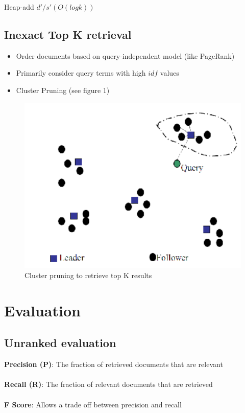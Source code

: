 \documentclass{article}%
\begin{document}
Heap-add $d′/s′ (O(log k))$
\subsection*{Inexact Top K retrieval}
\begin{itemize}
    \item Order documents based on query-independent model (like PageRank)
    \item Primarily consider query terms with high $idf$ values
    \item Cluster Pruning (see figure 1)
\end{itemize}
\begin{figure}[h]
    \caption{Cluster pruning to retrieve top K results}
    \includegraphics[scale=.5]{ClusterPruning.png}
    \centering
\end{figure}
\section*{Evaluation}
\subsection*{Unranked evaluation}
\textbf{Precision (P)}: The fraction of retrieved documents that are relevant \\
\\
\textbf{Recall (R)}: The fraction of relevant documents that are retrieved \\
\\
\textbf{F Score}: Allows a trade off between precision and recall \\
\end{document}
